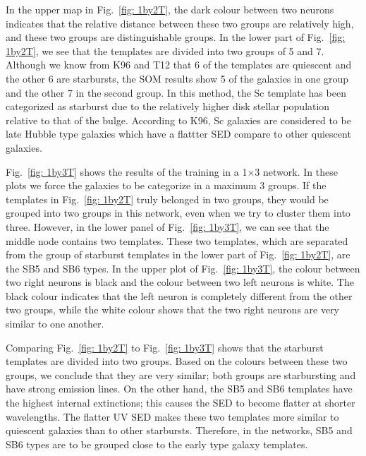         
            In the upper map in Fig.~\ref{fig: 1by2T}, the dark colour between two neurons indicates that the relative distance between these two groups are relatively high, and these two groups are distinguishable groups.%
            In the lower part of Fig.~\ref{fig: 1by2T}, we see that the templates are divided into two groups of 5 and 7.
            Although we know from K96 and T12 that 6 of the templates are quiescent and the other 6 are starbursts, the SOM results show 5 of the galaxies in one group and the other 7 in the second group.
            In this method, the Sc template has been categorized as starburst due to the relatively higher disk stellar population relative to that of the bulge. 
            According to K96, Sc galaxies are considered to be late Hubble type galaxies which have a flattter SED compare to other quiescent galaxies. 
            

            Fig.~\ref{fig: 1by3T} shows the results of the training in a 1$\times$3 network.
            In these plots we force the galaxies to be categorize in a maximum 3 groups. 
            If the templates in Fig.~\ref{fig: 1by2T} truly belonged in two groups, they would be grouped into two groups in this network, even when we try to cluster them into three. 
            However, in the lower panel of Fig.~\ref{fig: 1by3T}, we can see that the middle node contains two templates.
            These two templates, which are separated from the group of starburst templates in the lower part of Fig.~\ref{fig: 1by2T},  are the SB5 and SB6 types.
            In the upper plot of Fig.~\ref{fig: 1by3T}, the colour between two right neurons is black and the colour between two left neurons is white. 
            The black colour indicates that the left neuron is completely different from the other two groups,
            while the white colour shows that the two right neurons are very similar to one another. 
            
            Comparing Fig.~\ref{fig: 1by2T} to Fig.~\ref{fig: 1by3T} shows that the starburst templates are divided into two groups. 
            Based on the colours between these two groups, we conclude that they are very similar; both groups are starbursting and have strong emission lines.
            On the other hand, the SB5 and SB6 templates have the highest internal extinctions; this causes the SED to become flatter at shorter wavelengths. 
            The flatter UV SED makes these two templates more similar to quiescent galaxies than to other starbursts.
            Therefore, in the networks, SB5 and SB6 types are to be grouped close to the early type galaxy templates.
                
